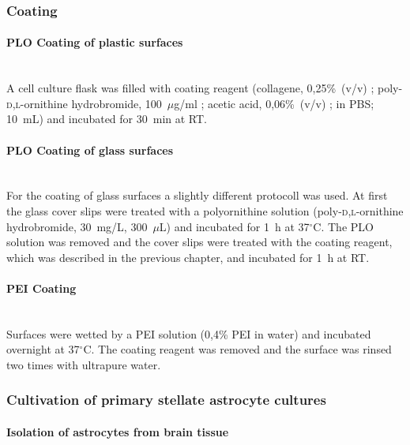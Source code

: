 \documentclass[a4paper,11pt,bibtotocnumbered]{article}
\begin{document}
\subsubsection{Coating}

\paragraph{PLO Coating of plastic surfaces} $~$ \\

A cell culture flask was filled with coating reagent (collagene, 0,25\%~(v/v) ; poly-\textsc{d,l}-ornithine hydrobromide, 100~$\mu$g/ml ; acetic acid, 0,06\%~(v/v) ; in PBS; 10~mL) and incubated for 30~min at RT.


\paragraph{PLO Coating of glass surfaces} $~$ \\

For the coating of glass surfaces a slightly different protocoll was used. At first the glass cover slips were treated with a polyornithine solution (poly-\textsc{d,l}-ornithine hydrobromide, 30~mg/L, 300~$\mu$L) and incubated for 1~h at 37$^\circ$C. The PLO solution was removed and the cover slips were treated with the coating reagent, which was described in the previous chapter, and incubated for 1~h at RT.

\paragraph{PEI Coating} $~$ \\

Surfaces were wetted by a PEI solution (0,4\% PEI in water) and incubated overnight at 37$^\circ$C. The coating reagent was removed and the surface was rinsed two times with ultrapure water.

\subsubsection{Cultivation of primary stellate astrocyte cultures}

\paragraph{Isolation of astrocytes from brain tissue} $~$ \\
\end{document}
